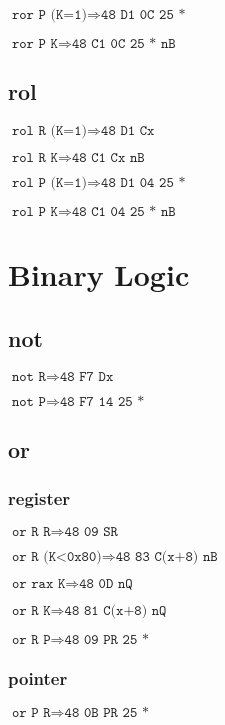 \documentclass{article}
\begin{document}
$\texttt{ror P (K=1)} \Rightarrow \texttt{48 D1 0C 25 *}$

$\texttt{ror P K} \Rightarrow \texttt{48 C1 0C 25 * nB}$


\subsection{rol}

$\texttt{rol R (K=1)} \Rightarrow \texttt{48 D1 Cx}$

$\texttt{rol R K} \Rightarrow \texttt{48 C1 Cx nB}$

$\texttt{rol P (K=1)} \Rightarrow \texttt{48 D1 04 25 *}$

$\texttt{rol P K} \Rightarrow \texttt{48 C1 04 25 * nB}$


\section{Binary Logic}

\subsection{not}

$\texttt{not R} \Rightarrow \texttt{48 F7 Dx}$

$\texttt{not P} \Rightarrow \texttt{48 F7 14 25 *}$


\subsection{or}

\subsubsection{register}

$\texttt{or R R} \Rightarrow \texttt{48 09 SR}$

$\texttt{or R (K<0x80)} \Rightarrow \texttt{48 83 C(x+8) nB}$

$\texttt{or rax K} \Rightarrow \texttt{48 0D nQ}$

$\texttt{or R K} \Rightarrow \texttt{48 81 C(x+8) nQ}$

$\texttt{or R P} \Rightarrow \texttt{48 09 PR 25 *}$


\subsubsection{pointer}

$\texttt{or P R} \Rightarrow \texttt{48 0B PR 25 *}$
\end{document}
